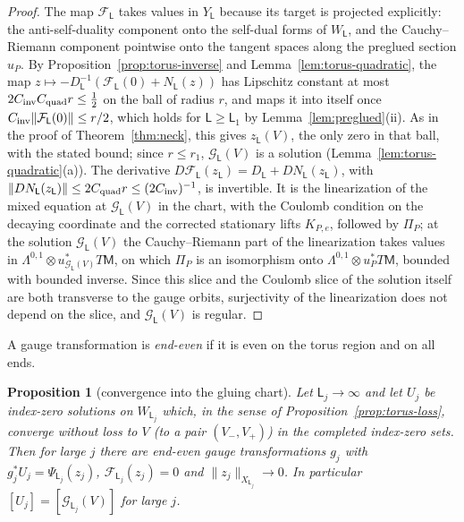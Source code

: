 \documentclass[11pt]{amsart}
\newtheorem{proposition}[theorem]{Proposition}
\theoremstyle{definition}
\theoremstyle{remark}
\theoremstyle{plain}
\numberwithin{equation}{section}
\newcommand{\Msf}{\mathsf{M}}
\begin{document}
\begin{proof}
The map $\mathcal F_\mathsf L$ takes values in $Y_\mathsf L$ because its target is projected explicitly: the
anti-self-duality component onto the self-dual forms of $W_\mathsf L$, and the Cauchy--Riemann
component pointwise onto the tangent spaces along the preglued section $u_P$. By
Proposition~\ref{prop:torus-inverse} and Lemma~\ref{lem:torus-quadratic}, the map
$z\mapsto-D_{\mathsf L}^{-1}(\mathcal F_{\mathsf L}(0)+N_{\mathsf L}(z))$ has Lipschitz constant at most
$2C_{\rm inv}C_{\rm quad}r\le\tfrac12$ on the ball of radius $r$, and maps it into itself once
$C_{\rm inv}\|\mathcal F_{\mathsf L}(0)\|\le r/2$, which holds for $\mathsf L\ge \mathsf L_1$ by
Lemma~\ref{lem:preglued}(ii). As in the proof of Theorem~\ref{thm:neck}, this gives $z_\mathsf L(V)$,
the only zero in that ball, with the stated bound; since $r\le r_1$, $\mathcal G_\mathsf L(V)$ is a
solution (Lemma~\ref{lem:torus-quadratic}(a)). The derivative
$D\mathcal F_{\mathsf L}(z_\mathsf L)=D_\mathsf L+DN_{\mathsf L}(z_\mathsf L)$, with
$\|DN_{\mathsf L}(z_\mathsf L)\|\le2C_{\rm quad}r\le(2C_{\rm inv})^{-1}$, is invertible. It is the linearization of the mixed equation at $\mathcal G_{\mathsf L}(V)$ in the chart, with
the Coulomb condition on the decaying coordinate and the corrected
stationary lifts $K_{P,e}$, followed by
$\Pi_P$; at the solution $\mathcal G_\mathsf L(V)$ the Cauchy--Riemann part of the linearization takes values
in $\Lambda^{0,1}\otimes u^*_{\mathcal G_\mathsf L(V)}T\Msf$, on which $\Pi_P$ is an isomorphism onto
$\Lambda^{0,1}\otimes u_P^*T\Msf$, bounded with bounded inverse. Since this
slice and the Coulomb slice of the solution itself are both transverse to the
gauge orbits, surjectivity of the linearization does not depend on the slice, and
$\mathcal G_{\mathsf L}(V)$ is regular.
\end{proof}

A gauge transformation is \emph{end-even} if it is even on the torus region and on all ends.

\begin{proposition}[convergence into the gluing chart]\label{prop:torus-entry}
Let $\mathsf L_j\to\infty$ and let $U_j$ be index-zero solutions on $W_{\mathsf L_j}$ which, in the
sense of Proposition~\ref{prop:torus-loss}, converge without loss to $V$ (to a pair
$(V_-,V_+)$) in the completed index-zero sets. Then for large $j$ there are end-even gauge transformations $g_j$ with $g_j^*U_j=\Psi_{\mathsf L_j}(z_j)$, $\mathcal F_{\mathsf L_j}(z_j)=0$ and
$\|z_j\|_{X_{\mathsf L_j}}\to0$. In particular $[U_j]=[\mathcal G_{\mathsf L_j}(V)]$ for large $j$.
\end{proposition}
\end{document}
